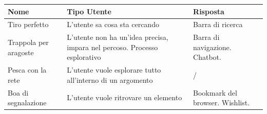 \documentclass[]{TWDocumentFull}
\begin{document}
\begin{longtable}[]{@{}lll@{}}
\toprule
\begin{minipage}[b]{0.30\columnwidth}\raggedright
Nome\strut
\end{minipage} & \begin{minipage}[b]{0.30\columnwidth}\raggedright
Tipo Utente\strut
\end{minipage} & \begin{minipage}[b]{0.30\columnwidth}\raggedright
Risposta\strut
\end{minipage}\tabularnewline
\midrule
\endhead
\begin{minipage}[t]{0.30\columnwidth}\raggedright
Tiro perfetto\strut
\end{minipage} & \begin{minipage}[t]{0.30\columnwidth}\raggedright
L'utente sa cosa sta cercando\strut
\end{minipage} & \begin{minipage}[t]{0.30\columnwidth}\raggedright
Barra di ricerca\strut
\end{minipage}\tabularnewline
\begin{minipage}[t]{0.30\columnwidth}\raggedright
Trappola per aragoste\strut
\end{minipage} & \begin{minipage}[t]{0.30\columnwidth}\raggedright
L'utente non ha un'idea precisa, impara nel percoso. Processo
esplorativo\strut
\end{minipage} & \begin{minipage}[t]{0.30\columnwidth}\raggedright
Barra di navigazione. Chatbot.\strut
\end{minipage}\tabularnewline
\begin{minipage}[t]{0.30\columnwidth}\raggedright
Pesca con la rete\strut
\end{minipage} & \begin{minipage}[t]{0.30\columnwidth}\raggedright
L'utente vuole esplorare tutto all'interno di un argomento\strut
\end{minipage} & \begin{minipage}[t]{0.30\columnwidth}\raggedright
/\strut
\end{minipage}\tabularnewline
\begin{minipage}[t]{0.30\columnwidth}\raggedright
Boa di segnalazione\strut
\end{minipage} & \begin{minipage}[t]{0.30\columnwidth}\raggedright
L'utente vuole ritrovare un elemento\strut
\end{minipage} & \begin{minipage}[t]{0.30\columnwidth}\raggedright
Bookmark del browser. Wishlist.\strut
\end{minipage}\tabularnewline
\bottomrule
\end{longtable}
\end{document}
